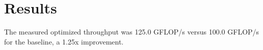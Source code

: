 \section{Results}
The measured optimized throughput was 125.0 GFLOP/s versus 100.0 GFLOP/s for the baseline, a 1.25x improvement.
